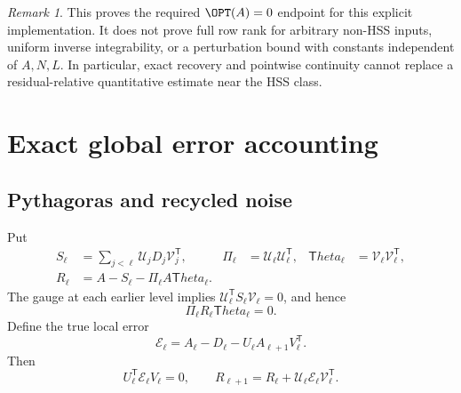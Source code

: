\documentclass[11pt,oneside,openany,a4paper]{book}
\numberwithin{equation}{chapter}
\theoremstyle{definition}
\theoremstyle{remark}
\newtheorem{remark}[theorem]{Remark}
\newcommand{\T}{\mathsf T}\newcommand{\Id}{I}
\newcommand{\UC}{\mathcal U}\newcommand{\VC}{\mathcal V}\newcommand{\err}{\mathcal E}
\begin{document}
\begin{remark}
This proves the required $\OPT(A)=0$ endpoint for this explicit implementation.
It does not prove full row rank for arbitrary non-HSS inputs, uniform inverse
integrability, or a perturbation bound with constants independent of $A,N,L$.
In particular, exact recovery and pointwise continuity cannot replace a
residual-relative quantitative estimate near the HSS class.
\end{remark}

\section{Exact global error accounting}\label{base:sec:global}
\subsection{Pythagoras and recycled noise}
Put
\begin{align}
 S_\ell&=\sum_{j<\ell}\UC_jD_j\VC_j^{\T},&
 \Pi_\ell&=\UC_\ell\UC_\ell^{\T},&
 \T heta_\ell&=\VC_\ell\VC_\ell^{\T},\label{base:eq:global-projectors}\\
 R_\ell&=A-S_\ell-\Pi_\ell A\T heta_\ell.&&&\label{base:eq:accumulated-R}
\end{align}
The gauge at each earlier level implies
$\UC_\ell^{\T} S_\ell\VC_\ell=0$, and hence
\begin{equation}\label{base:eq:retained-zero}
 \Pi_\ell R_\ell\T heta_\ell=0.
\end{equation}
Define the true local error
\begin{equation}\label{base:eq:local-error}
 \err_\ell=A_\ell-D_\ell-U_\ell A_{\ell+1}V_\ell^{\T}.
\end{equation}
Then
\begin{equation}\label{base:eq:local-zero}
 U_\ell^{\T}\err_\ell V_\ell=0,
 \qquad
 R_{\ell+1}=R_\ell+\UC_\ell\err_\ell\VC_\ell^{\T}.
\end{equation}
\end{document}
